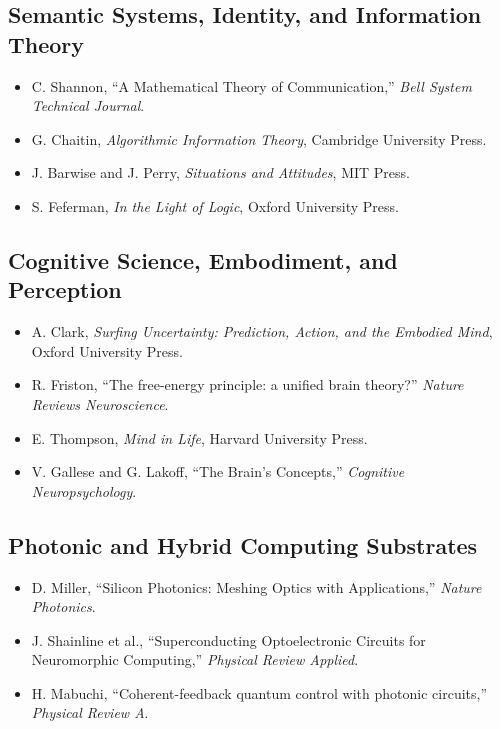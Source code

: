 \subsection*{Semantic Systems, Identity, and Information Theory}

\begin{itemize}
\tightlist
\item C. Shannon, ``A Mathematical Theory of Communication,'' \emph{Bell System Technical Journal}.
\item G. Chaitin, \emph{Algorithmic Information Theory}, Cambridge University Press.
\item J. Barwise and J. Perry, \emph{Situations and Attitudes}, MIT Press.
\item S. Feferman, \emph{In the Light of Logic}, Oxford University Press.
\end{itemize}

\subsection*{Cognitive Science, Embodiment, and Perception}

\begin{itemize}
\tightlist
\item A. Clark, \emph{Surfing Uncertainty: Prediction, Action, and the Embodied Mind}, Oxford University Press.
\item R. Friston, ``The free-energy principle: a unified brain theory?'' \emph{Nature Reviews Neuroscience}.
\item E. Thompson, \emph{Mind in Life}, Harvard University Press.
\item V. Gallese and G. Lakoff, ``The Brain's Concepts,'' \emph{Cognitive Neuropsychology}.
\end{itemize}

\subsection*{Photonic and Hybrid Computing Substrates}

\begin{itemize}
\tightlist
\item D. Miller, ``Silicon Photonics: Meshing Optics with Applications,'' \emph{Nature Photonics}.
\item J. Shainline et al., ``Superconducting Optoelectronic Circuits for Neuromorphic Computing,'' \emph{Physical Review Applied}.
\item H. Mabuchi, ``Coherent-feedback quantum control with photonic circuits,'' \emph{Physical Review A}.
\end{itemize}

